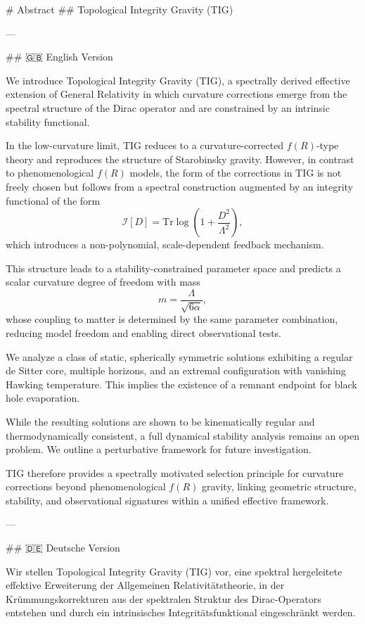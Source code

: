 # Abstract  
## Topological Integrity Gravity (TIG)

---

## 🇬🇧 English Version

We introduce Topological Integrity Gravity (TIG), a spectrally derived effective extension of General Relativity in which curvature corrections emerge from the spectral structure of the Dirac operator and are constrained by an intrinsic stability functional.

In the low-curvature limit, TIG reduces to a curvature-corrected \(f(R)\)-type theory and reproduces the structure of Starobinsky gravity. However, in contrast to phenomenological \(f(R)\) models, the form of the corrections in TIG is not freely chosen but follows from a spectral construction augmented by an integrity functional of the form
\[
\mathcal{I}[D] = \mathrm{Tr}\log\left(1 + \frac{D^2}{\Lambda^2}\right),
\]
which introduces a non-polynomial, scale-dependent feedback mechanism.

This structure leads to a stability-constrained parameter space and predicts a scalar curvature degree of freedom with mass
\[
m = \frac{\Lambda}{\sqrt{6\alpha}},
\]
whose coupling to matter is determined by the same parameter combination, reducing model freedom and enabling direct observational tests.

We analyze a class of static, spherically symmetric solutions exhibiting a regular de Sitter core, multiple horizons, and an extremal configuration with vanishing Hawking temperature. This implies the existence of a remnant endpoint for black hole evaporation.

While the resulting solutions are shown to be kinematically regular and thermodynamically consistent, a full dynamical stability analysis remains an open problem. We outline a perturbative framework for future investigation.

TIG therefore provides a spectrally motivated selection principle for curvature corrections beyond phenomenological \(f(R)\) gravity, linking geometric structure, stability, and observational signatures within a unified effective framework.

---

## 🇩🇪 Deutsche Version

Wir stellen Topological Integrity Gravity (TIG) vor, eine spektral hergeleitete effektive Erweiterung der Allgemeinen Relativitätstheorie, in der Krümmungskorrekturen aus der spektralen Struktur des Dirac-Operators entstehen und durch ein intrinsisches Integritätsfunktional eingeschränkt werden.

